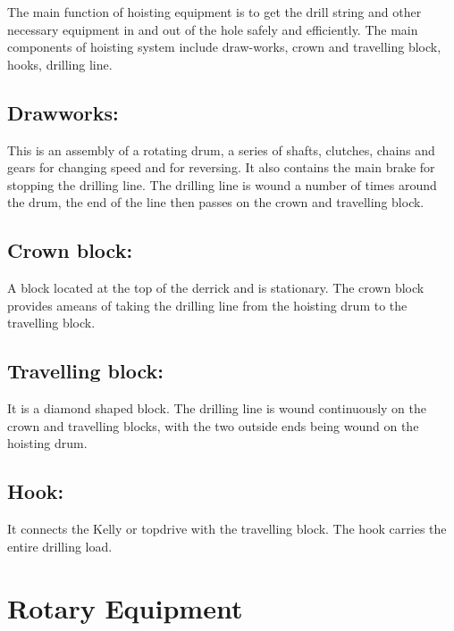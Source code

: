 The main function of hoisting equipment is to get the drill string and 
other necessary equipment in and out of the hole safely and efficiently. 
The main components of hoisting system include draw-works, crown and travelling block, hooks, drilling line.

\vspace{1em}

\subsection*{\textbf{Drawworks:}} This is an assembly of a rotating drum, a series of shafts, 
clutches, chains and gears for changing speed and for reversing.
 It also contains the main brake for stopping the drilling line. 
The drilling line is wound a number of times around the drum, 
the end of the line then passes on the crown and travelling block.

\vspace{1em}

\subsection*{\textbf{Crown block:}} A block located at the top of the derrick and is stationary.
 The crown block provides ameans of taking the drilling line from the hoisting drum to the travelling block.

\vspace{1em}

\subsection*{\textbf{Travelling block:}} It is a diamond shaped block. 
The drilling line is wound continuously on the crown and travelling blocks,
 with the two outside ends being wound on the hoisting drum.

\vspace{1em}

\subsection*{\textbf{Hook:}} It connects the Kelly or topdrive with the travelling block. The hook carries the entire drilling load.

\section{Rotary Equipment}

